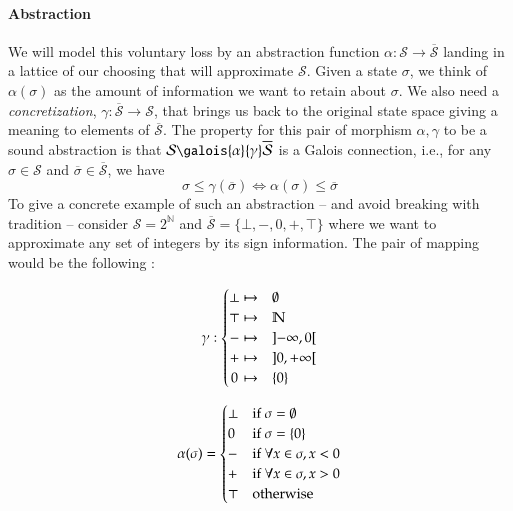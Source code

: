 \documentclass[11pt]{article}
\renewcommand{\S}{\mathcal{S}}
\newcommand{\oS}{\overline{\mathcal{S}}}
\begin{document}
\paragraph{Abstraction} We will model this voluntary loss by an abstraction function $\alpha:\S\to\oS$ landing in a lattice of our choosing that will approximate $\S$. Given a state $\sigma$, we think of $\alpha(\sigma)$ as the amount of information we want to retain about $\sigma$. We also need a \emph{concretization}, $\gamma:\oS\to\S$, that brings us back to the original state space giving a meaning to elements of $\oS$. The property for this pair of morphism $\alpha,\gamma$ to be a sound abstraction is that $\S\galois{\alpha}{\gamma}\oS$ is a Galois connection, i.e., for any $\sigma\in\S$ and $\overline{\sigma}\in\oS$, we have
\[ \sigma \leq \gamma(\overline{\sigma}) \iff \alpha(\sigma) \leq \overline{\sigma} \]
To give a concrete example of such an abstraction -- and avoid breaking with tradition -- consider $\S = 2^{\mathbb{N}}$ and $\oS = \{\bot,-,0,+,\top\}$ where we want to approximate any set of integers by its sign information. The pair of mapping would be the following :

\hfill

\begin{minipage}{0.4\linewidth}
\[
\gamma:
\begin{cases}
\hfill \bot \hfill \mapsto & \emptyset \\
\hfill \top \hfill \mapsto & \mathbb{N} \\
\hfill -   \hfill \mapsto & \left]-\infty,0\right[ \\
\hfill +   \hfill \mapsto & \left]0,+\infty\right[ \\
\hfill 0   \hfill \mapsto & \left\{0\right\} \\
\end{cases}
\]
\end{minipage}
\quad
\begin{minipage}{0.4\linewidth}
\[
\alpha(\sigma) =
\begin{cases}
\bot \hfill & \text{if } \sigma = \emptyset \\
 0   \hfill & \text{if } \sigma = \left\{0\right\} \\
 -   \hfill & \text{if } \forall x\in\sigma, x < 0 \\
 +   \hfill & \text{if } \forall x\in\sigma, x > 0 \\
\top \hfill & \text{otherwise} \\
\end{cases}
\]
\end{minipage}
\end{document}
